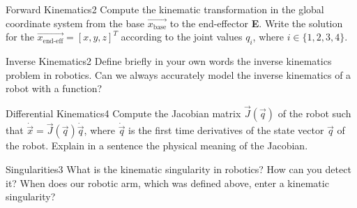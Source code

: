 \begin{questions}


\begin{question}{Forward Kinematics}{2}
Compute the kinematic transformation in the global coordinate system from the base $\vec{x_\textrm{base}}$ to the end-effector \textbf{E}.  
Write the solution for the $\vec{x_\textrm{end-eff}}=[x,y,z]^T$  according to the joint values $q_i$, where $i \in \{1,2,3,4\}$.

\begin{answer}\end{answer}

\end{question}


\begin{question}{Inverse Kinematics}{2}
Define briefly in your own words the inverse kinematics problem in robotics.  
Can we always accurately model the inverse kinematics of a robot with a
function?

\begin{answer}\end{answer}

\end{question}


\begin{question}{Differential Kinematics}{4}
Compute the Jacobian matrix $\vec{J}(\vec{q})$ of the robot such that $\dot{\vec{x}}=\vec{J}(\vec{q})\dot{\vec{q}}$, where $\dot{\vec{q}}$ is the first time derivatives of the state vector $\vec{q}$ of the robot. Explain in a sentence the physical meaning of the Jacobian. 

\begin{answer}


\end{answer}

\end{question}


\begin{question}{Singularities}{3}
What is the kinematic singularity in robotics? How can you detect it? When does our robotic arm, which was defined above, enter a kinematic singularity?


\end{question}
\end{questions}

